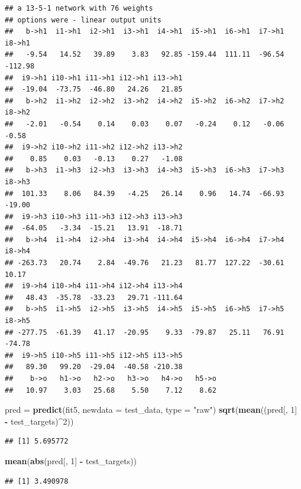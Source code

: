 \documentclass[10pt,ignorenonframetext,]{beamer}
\newenvironment{Shaded}{\begin{snugshade}}{\end{snugshade}}
\newcommand{\DataTypeTok}[1]{\textcolor[rgb]{0.13,0.29,0.53}{#1}}
\newcommand{\DecValTok}[1]{\textcolor[rgb]{0.00,0.00,0.81}{#1}}
\newcommand{\KeywordTok}[1]{\textcolor[rgb]{0.13,0.29,0.53}{\textbf{#1}}}
\newcommand{\NormalTok}[1]{#1}
\newcommand{\OperatorTok}[1]{\textcolor[rgb]{0.81,0.36,0.00}{\textbf{#1}}}
\newcommand{\StringTok}[1]{\textcolor[rgb]{0.31,0.60,0.02}{#1}}
\begin{document}
\begin{frame}[fragile]
\begin{verbatim}
## a 13-5-1 network with 76 weights
## options were - linear output units 
##   b->h1  i1->h1  i2->h1  i3->h1  i4->h1  i5->h1  i6->h1  i7->h1  i8->h1 
##   -9.54   14.52   39.89    3.83   92.85 -159.44  111.11  -96.54 -112.98 
##  i9->h1 i10->h1 i11->h1 i12->h1 i13->h1 
##  -19.04  -73.75  -46.80   24.26   21.85 
##   b->h2  i1->h2  i2->h2  i3->h2  i4->h2  i5->h2  i6->h2  i7->h2  i8->h2 
##   -2.01   -0.54    0.14    0.03    0.07   -0.24    0.12   -0.06   -0.58 
##  i9->h2 i10->h2 i11->h2 i12->h2 i13->h2 
##    0.85    0.03   -0.13    0.27   -1.08 
##   b->h3  i1->h3  i2->h3  i3->h3  i4->h3  i5->h3  i6->h3  i7->h3  i8->h3 
##  101.33    8.06   84.39   -4.25   26.14    0.96   14.74  -66.93  -19.00 
##  i9->h3 i10->h3 i11->h3 i12->h3 i13->h3 
##  -64.05   -3.34  -15.21   13.91  -18.71 
##   b->h4  i1->h4  i2->h4  i3->h4  i4->h4  i5->h4  i6->h4  i7->h4  i8->h4 
## -263.73   20.74    2.84  -49.76   21.23   81.77  127.22  -30.61   10.17 
##  i9->h4 i10->h4 i11->h4 i12->h4 i13->h4 
##   48.43  -35.78  -33.23   29.71 -111.64 
##   b->h5  i1->h5  i2->h5  i3->h5  i4->h5  i5->h5  i6->h5  i7->h5  i8->h5 
## -277.75  -61.39   41.17  -20.95    9.33  -79.87   25.11   76.91  -74.78 
##  i9->h5 i10->h5 i11->h5 i12->h5 i13->h5 
##   89.30   99.20  -29.04  -40.58 -210.38 
##    b->o   h1->o   h2->o   h3->o   h4->o   h5->o 
##   10.97    3.03   25.68    5.50    7.12    8.62
\end{verbatim}

\begin{Shaded}
\begin{Highlighting}[]
\NormalTok{pred =}\StringTok{ }\KeywordTok{predict}\NormalTok{(fit5, }\DataTypeTok{newdata =}\NormalTok{ test_data, }\DataTypeTok{type =} \StringTok{"raw"}\NormalTok{)}
\KeywordTok{sqrt}\NormalTok{(}\KeywordTok{mean}\NormalTok{((pred[, }\DecValTok{1}\NormalTok{] }\OperatorTok{-}\StringTok{ }\NormalTok{test_targets)}\OperatorTok{^}\DecValTok{2}\NormalTok{))}
\end{Highlighting}
\end{Shaded}

\begin{verbatim}
## [1] 5.695772
\end{verbatim}

\begin{Shaded}
\begin{Highlighting}[]
\KeywordTok{mean}\NormalTok{(}\KeywordTok{abs}\NormalTok{(pred[, }\DecValTok{1}\NormalTok{] }\OperatorTok{-}\StringTok{ }\NormalTok{test_targets))}
\end{Highlighting}
\end{Shaded}

\begin{verbatim}
## [1] 3.490978
\end{verbatim}

\end{frame}
\end{document}
